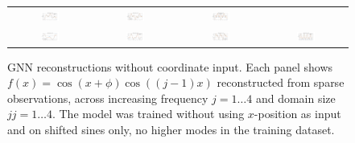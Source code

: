 \begin{figure}[ht]
\begin{tabular}{cccc}
    \includegraphics[width=0.23\textwidth]{images/gnn_obs_no_pos_j3_jj2_0.png} &
    \includegraphics[width=0.23\textwidth]{images/gnn_obs_no_pos_j3_jj3_0.png} &
    \includegraphics[width=0.23\textwidth]{images/gnn_obs_no_pos_j3_jj4_0.png} \\
    \includegraphics[width=0.23\textwidth]{images/gnn_obs_no_pos_j4_jj1_0.png} &
    \includegraphics[width=0.23\textwidth]{images/gnn_obs_no_pos_j4_jj2_0.png} &
    \includegraphics[width=0.23\textwidth]{images/gnn_obs_no_pos_j4_jj3_0.png} &
    \includegraphics[width=0.23\textwidth]{images/gnn_obs_no_pos_j4_jj4_0.png} \\
  \end{tabular}
  \caption{GNN reconstructions without coordinate input. Each panel shows $f(x) = \cos(x + \phi)\cos((j-1)x)$ reconstructed from sparse observations, across increasing frequency $j = 1\ldots4$ and domain size $jj = 1\ldots4$. The model was trained without using $x$-position as input and on shifted sines only, no higher modes in the training dataset.}
  \label{fig:gnn_no_pos_grid}
\end{figure}

